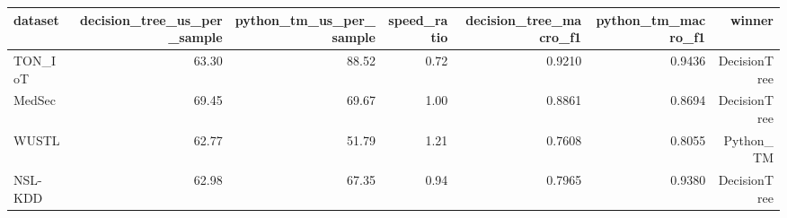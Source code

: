 \begin{tabular}{lrrrrrr}
\toprule
dataset & decision\_tree\_us\_per\_sample & python\_tm\_us\_per\_sample & speed\_ratio & decision\_tree\_macro\_f1 & python\_tm\_macro\_f1 & winner \\
\midrule
TON\_IoT & 63.30 & 88.52 & 0.72 & 0.9210 & 0.9436 & DecisionTree \\
MedSec & 69.45 & 69.67 & 1.00 & 0.8861 & 0.8694 & DecisionTree \\
WUSTL & 62.77 & 51.79 & 1.21 & 0.7608 & 0.8055 & Python\_TM \\
NSL-KDD & 62.98 & 67.35 & 0.94 & 0.7965 & 0.9380 & DecisionTree \\
\bottomrule
\end{tabular}
